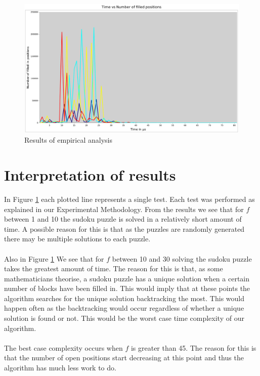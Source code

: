 \documentclass[12pt,a4paper,titlepage]{article}
\begin{document}
\begin{figure}[H]
\centering
\includegraphics[width = \textwidth]{graph1}
\caption{Results of empirical analysis}
\label{fig:graph1}
\end{figure}

\section{Interpretation of results}

In Figure \ref{fig:graph1} each plotted line represents a single test. Each test was performed as explained in our Experimental Methodology. From the results we see that for $f$ between 1 and 10 the sudoku puzzle is solved in a relatively short amount of time. A possible reason for this is that as the puzzles are randomly generated there may be multiple solutions to each puzzle.
\\
\\
Also in Figure \ref{fig:graph1} We see that for $f$ between 10 and 30 solving the sudoku puzzle takes the greatest amount of time. The reason for this is that, as some mathematicians theorise, a sudoku puzzle has a unique solution when a certain number of blocks have been filled in. This would imply that at these points the algorithm searches for the unique solution backtracking the most. This would happen often as the backtracking would occur regardless of whether a unique solution is found or not. This would be the worst case time complexity of our algorithm. 
\\
\\
The best case complexity occurs when $f$ is greater than 45. The reason for this is that the number of open positions start decreasing at this point and thus the algorithm has much less work to do.    
\end{document}
